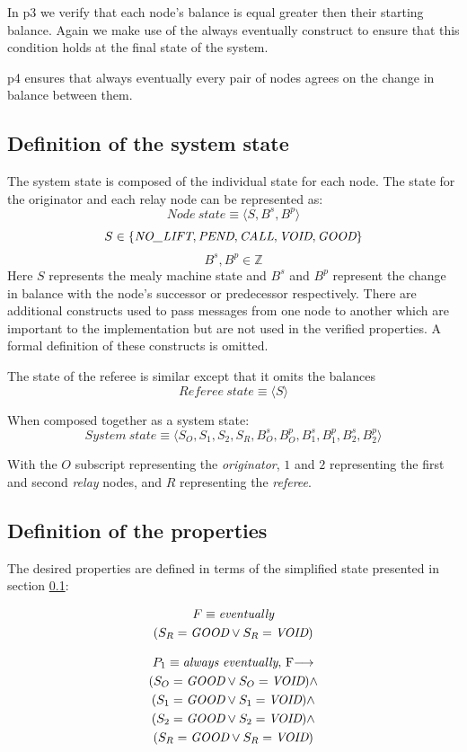 \documentclass[runningheads]{llncs}
\newcommand{\originatorstate}{S_O}
\newcommand{\relayastate}{S_1}
\newcommand{\relaybstate}{S_2}
\newcommand{\refstate}{S_R}
\newcommand{\nolift}{\emph{NO\_LIFT}}
\newcommand{\pend}{\emph{PEND}}
\newcommand{\call}{\emph{CALL}}
\newcommand{\void}{\emph{VOID}}
\newcommand{\good}{\emph{GOOD}}
\newcommand{\always}{\emph{always}}
\newcommand{\eventually}{\emph{eventually}}
\newcommand{\fair}{$F$}
\begin{document}
In p3 we verify that each node's balance is equal greater then their starting balance. Again we make use of the always eventually construct to ensure that this condition holds at the final state of the system.

p4 ensures that always eventually every pair of nodes agrees on the change in balance between them. 

\subsection{Definition of the system state}\label{sec:statedef}
The system state is composed of the individual state for each node. The state for the originator and each relay node can be represented as:
$$Node~state \equiv \langle S, B^s, B^p \rangle$$
$$
S \in \{\nolift, \pend, \call, \void, \good\}
$$
$$
B^s, B^p \in \mathds{Z}
$$
Here $S$ represents the mealy machine state and $B^s$ and $B^p$ represent the change in balance with the node's successor or predecessor respectively.
There are additional constructs used to pass messages from one node to another which are important to the implementation but are not used in the verified properties. A formal definition of these constructs is omitted. 

The state of the referee is similar except that it omits the balances
$$Referee~state \equiv \langle S \rangle$$

When composed together as a system state:
$$System~state \equiv \langle S_O, S_1, S_2, S_R, B^s_O, B^p_O, B^s_1, B^p_1, B^s_2, B^p_2  \rangle$$

With the $O$ subscript representing the \emph{originator}, $1$ and $2$ representing the first and second \emph{relay} nodes, and $R$ representing the \emph{referee}.

\subsection{Definition of the properties}
The desired properties are defined in terms of the simplified state presented in section \ref{sec:statedef}:

\begin{multline*}
    F \equiv \eventually \\
     (\refstate = \good \vee \refstate = \void) \\
\end{multline*}

\begin{multline*}
    P_1 \equiv \always\ \eventually,\ \fair \longrightarrow \\
    (\originatorstate = \good \vee \originatorstate = \void) \wedge \\
     (\relayastate = \good \vee \relayastate = \void) \wedge \\
     (\relaybstate = \good \vee \relaybstate = \void) \wedge \\
     (\refstate = \good \vee \refstate = \void) \\
\end{multline*}
    
\end{document}
